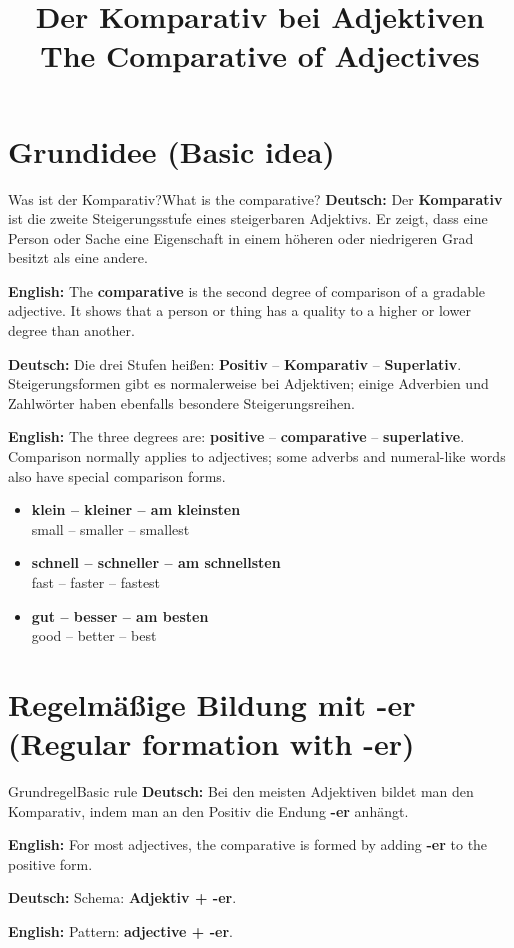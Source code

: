\documentclass[a4paper,11pt]{article}
\title{Der Komparativ bei Adjektiven\\\large\textnormal{The Comparative of Adjectives}}
\date{}
\newcommand{\GermanText}[1]{\textbf{Deutsch: }#1\par}
\newcommand{\EnglishText}[1]{{\small\color{SoftGray}\textbf{English: }#1\par}}
\newcommand{\ExampleItem}[2]{\item \textbf{#1}\\{\small\color{SoftGray}#2}}
\begin{document}
\maketitle
\tableofcontents
\newpage

\section{Grundidee \textnormal{(Basic idea)}}

\begin{grammarentry}{Was ist der Komparativ?}{What is the comparative?}
\GermanText{Der \textbf{Komparativ} ist die zweite Steigerungsstufe eines steigerbaren Adjektivs. Er zeigt, dass eine Person oder Sache eine Eigenschaft in einem höheren oder niedrigeren Grad besitzt als eine andere.}
\EnglishText{The \textbf{comparative} is the second degree of comparison of a gradable adjective. It shows that a person or thing has a quality to a higher or lower degree than another.}

\GermanText{Die drei Stufen heißen: \textbf{Positiv} -- \textbf{Komparativ} -- \textbf{Superlativ}. Steigerungsformen gibt es normalerweise bei Adjektiven; einige Adverbien und Zahlwörter haben ebenfalls besondere Steigerungsreihen.}
\EnglishText{The three degrees are: \textbf{positive} -- \textbf{comparative} -- \textbf{superlative}. Comparison normally applies to adjectives; some adverbs and numeral-like words also have special comparison forms.}
\end{grammarentry}

\begin{exbox}
\begin{itemize}
\ExampleItem{klein -- kleiner -- am kleinsten}{small -- smaller -- smallest}
\ExampleItem{schnell -- schneller -- am schnellsten}{fast -- faster -- fastest}
\ExampleItem{gut -- besser -- am besten}{good -- better -- best}
\end{itemize}
\end{exbox}

\section{Regelmäßige Bildung mit -er \textnormal{(Regular formation with -er)}}

\begin{grammarentry}{Grundregel}{Basic rule}
\GermanText{Bei den meisten Adjektiven bildet man den Komparativ, indem man an den Positiv die Endung \textbf{-er} anhängt.}
\EnglishText{For most adjectives, the comparative is formed by adding \textbf{-er} to the positive form.}

\GermanText{Schema: \textbf{Adjektiv + -er}.}
\EnglishText{Pattern: \textbf{adjective + -er}.}
\end{grammarentry}
\end{document}
